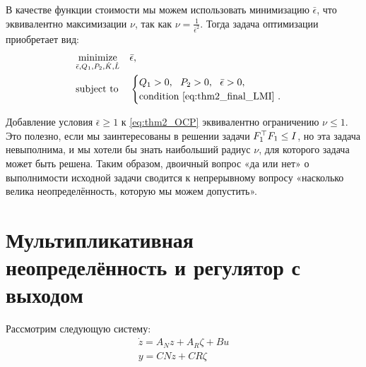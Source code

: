В качестве функции стоимости мы можем использовать минимизацию $\bar{\epsilon}$, что эквивалентно максимизации $\nu$, так как $\nu=\frac{1}{\bar{\epsilon}^2}$. Тогда задача оптимизации приобретает вид:
%
\begin{equation}
	\label{eq:thm2_OCP}
	\begin{aligned}
		& \underset{\bar{\epsilon},{Q}_1, {P}_2,\hat{{K}} , \hat{{L}} }{\text{minimize}}
		& &  \bar{\epsilon}, \\
		& \text{subject to}
		& & \begin{cases}
			{Q}_1>0, \ \
			{P}_2>0, \ \
			\bar{\epsilon}>0, \\
			\text{condition \eqref{eq:thm2_final_LMI} }.
		\end{cases}
	\end{aligned}
\end{equation}
\begin{remark}
	\label{rm:nu_trick}
	Добавление условия $\bar{\epsilon}\geq 1$ к \eqref{eq:thm2_OCP} эквивалентно ограничению $\nu \leq 1$. Это полезно, если мы заинтересованы в решении задачи ${F}_1^\top{F}_1 \leq {I}$, но эта задача невыполнима, и мы хотели бы знать наибольший радиус $\nu$, для которого задача может быть решена. Таким образом, двоичный вопрос «да или нет» о выполнимости исходной задачи сводится к непрерывному вопросу «насколько велика неопределённость, которую мы можем допустить».
\end{remark}
\section{Мультипликативная неопределённость и регулятор с выходом}\label{sec:ch3/sect4}
Рассмотрим следующую систему:
\begin{align}
	\dot{{z}} = {A}_N {z} + {A}_R {\zeta} + {B} {u}\\
	{y} = {C} {N} {z} + {C} {R} {\zeta}
\end{align}

